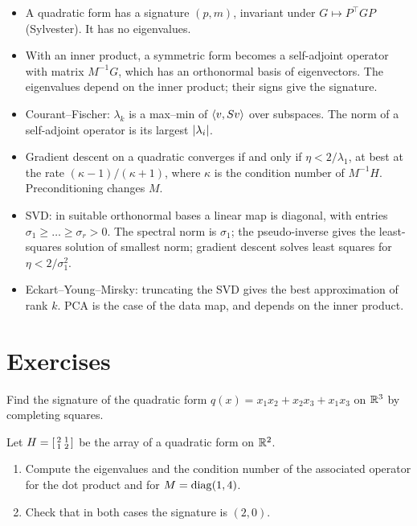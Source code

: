 \begin{notechapter}
\begin{chaptersummary}
\begin{itemize}[nosep]
  \item A quadratic form has a signature $(p, m)$, invariant under
        $G\mapsto P^\top GP$ (Sylvester). It has no eigenvalues.
  \item With an inner product, a symmetric form becomes a self-adjoint
        operator with matrix $M^{-1}G$, which has an orthonormal basis of
        eigenvectors. The eigenvalues depend on the inner product; their
        signs give the signature.
  \item Courant--Fischer: $\lambda_k$ is a max--min of
        $\left\langle v, Sv \right\rangle$ over subspaces. The norm of a self-adjoint
        operator is its largest $\left|\lambda_i\right|$.
  \item Gradient descent on a quadratic converges if and only if
        $\eta < 2/\lambda_1$, at best at the rate
        $(\kappa - 1)/(\kappa + 1)$, where $\kappa$ is the condition
        number of $M^{-1}H$. Preconditioning changes $M$.
  \item SVD: in suitable orthonormal bases a linear map is diagonal, with
        entries $\sigma_1\geq\dots\geq\sigma_r > 0$. The spectral norm is
        $\sigma_1$; the pseudo-inverse gives the least-squares solution of
        smallest norm; gradient descent solves least squares for
        $\eta < 2/\sigma_1^2$.
  \item Eckart--Young--Mirsky: truncating the SVD gives the best
        approximation of rank $k$. PCA is the case of the data map, and
        depends on the inner product.
\end{itemize}
\end{chaptersummary}

\section*{Exercises}

\begin{exercise}\label{spectral-svd:exr:1}
Find the signature of the quadratic form
$q(x) = x_1x_2 + x_2x_3 + x_1x_3$ on $\mathbb{R}^3$ by completing squares.
\end{exercise}

\begin{exercise}\label{spectral-svd:exr:2}
Let $H = \begin{bsmallmatrix}2 & 1\\1 & 2\end{bsmallmatrix}$ be the array
of a quadratic form on $\mathbb{R}^2$.
\begin{enumerate}[nosep]
  \item Compute the eigenvalues and the condition number of the
        associated operator for the dot product and for
        $M = \operatorname{diag}(1, 4)$.
  \item Check that in both cases the signature is $(2, 0)$.
\end{enumerate}
\end{exercise}


\end{notechapter}
